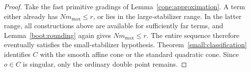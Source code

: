 \begin{proof}
Take the fast primitive gradings of
Lemma~\ref{cone:approximation}.  A term either
already has $Nm_{\max}\leq r$, or lies in the
large-stabilizer range.  In the latter range, all
constructions above are available for sufficiently far
terms, and Lemma~\ref{boot:rounding} again gives
$Nm_{\max}\leq r$.  The entire sequence therefore
eventually satisfies the small-stabilizer hypothesis.
Theorem~\ref{small:classification} identifies $C$ with
the smooth affine cone or the standard quadratic cone.
Since $o\in C$ is singular, only the ordinary double
point remains.
\end{proof}
